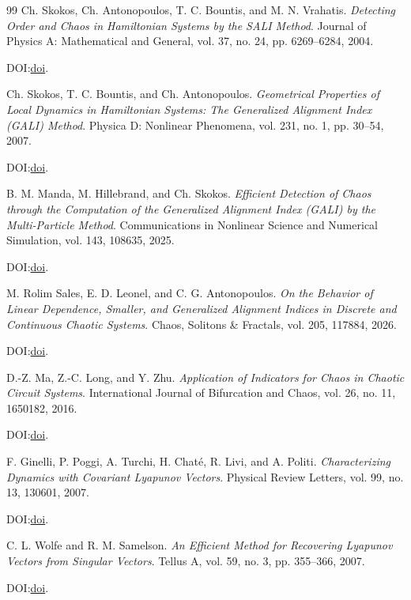 \documentclass[11pt]{article}
\begin{document}
\begin{thebibliography}{99}
Ch. Skokos, Ch. Antonopoulos, T. C. Bountis, and M. N. Vrahatis.
\emph{Detecting Order and Chaos in Hamiltonian Systems by the SALI Method}.
Journal of Physics A: Mathematical and General, vol. 37, no. 24,
pp. 6269--6284, 2004.
\par\noindent DOI:\@ \href{https://doi.org/10.1088/0305-4470/37/24/006}{doi}.

Ch. Skokos, T. C. Bountis, and Ch. Antonopoulos.
\emph{Geometrical Properties of Local Dynamics in Hamiltonian Systems: The Generalized Alignment Index (GALI) Method}.
Physica D: Nonlinear Phenomena, vol. 231, no. 1, pp. 30--54, 2007.
\par\noindent DOI:\@ \href{https://doi.org/10.1016/j.physd.2007.04.004}{doi}.

B. M. Manda, M. Hillebrand, and Ch. Skokos.
\emph{Efficient Detection of Chaos through the Computation of the Generalized Alignment Index (GALI) by the Multi-Particle Method}.
Communications in Nonlinear Science and Numerical Simulation, vol. 143,
108635, 2025.
\par\noindent DOI:\@ \href{https://doi.org/10.1016/j.cnsns.2025.108635}{doi}.

M. Rolim Sales, E. D. Leonel, and C. G. Antonopoulos.
\emph{On the Behavior of Linear Dependence, Smaller, and Generalized Alignment Indices in Discrete and Continuous Chaotic Systems}.
Chaos, Solitons \& Fractals, vol. 205, 117884, 2026.
\par\noindent DOI:\@ \href{https://doi.org/10.1016/j.chaos.2026.117884}{doi}.

D.-Z. Ma, Z.-C. Long, and Y. Zhu.
\emph{Application of Indicators for Chaos in Chaotic Circuit Systems}.
International Journal of Bifurcation and Chaos, vol. 26, no. 11,
1650182, 2016.
\par\noindent DOI:\@ \href{https://doi.org/10.1142/S0218127416501820}{doi}.

F. Ginelli, P. Poggi, A. Turchi, H. Chat\'{e}, R. Livi, and A. Politi.
\emph{Characterizing Dynamics with Covariant Lyapunov Vectors}.
Physical Review Letters, vol. 99, no. 13, 130601, 2007.
\par\noindent DOI:\@ \href{https://doi.org/10.1103/PhysRevLett.99.130601}{doi}.

C. L. Wolfe and R. M. Samelson.
\emph{An Efficient Method for Recovering Lyapunov Vectors from Singular Vectors}.
Tellus A, vol. 59, no. 3, pp. 355--366, 2007.
\par\noindent DOI:\@ \href{https://doi.org/10.1111/j.1600-0870.2007.00234.x}{doi}.


\end{thebibliography}
\end{document}
